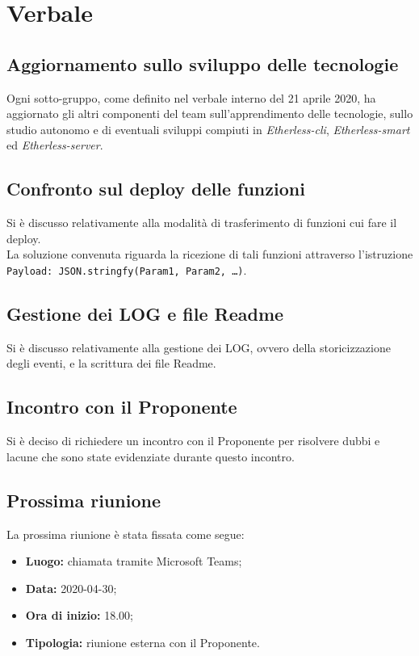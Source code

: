 \section{Verbale}

	\subsection{Aggiornamento sullo sviluppo delle tecnologie}
		Ogni sotto-gruppo, come definito nel verbale interno del 21 aprile 2020, ha aggiornato gli altri componenti del team sull'apprendimento delle tecnologie, sullo studio autonomo e di eventuali sviluppi compiuti in \textit{Etherless-cli}, \textit{Etherless-smart} ed \textit{Etherless-server}. 
	
	\subsection{Confronto sul deploy delle funzioni}
		Si è discusso relativamente alla modalità di trasferimento di funzioni cui fare il deploy.\\
		La soluzione convenuta riguarda la ricezione di tali funzioni attraverso l'istruzione \texttt{Payload: JSON.stringfy(Param1, Param2, …)}.
		
	\subsection{Gestione dei LOG e file Readme}
		Si è discusso relativamente alla gestione dei LOG, ovvero della storicizzazione degli eventi, e la scrittura dei file Readme.
	
	\subsection{Incontro con il Proponente}
		Si è deciso di richiedere un incontro con il Proponente per risolvere dubbi e lacune che sono state evidenziate durante questo incontro.
	
	\subsection{Prossima riunione}
		La prossima riunione è stata fissata come segue:
		\begin{itemize}
			\item \textbf{Luogo: } chiamata tramite Microsoft Teams; 
			\item \textbf{Data: } 2020-04-30;
			\item \textbf{Ora di inizio: } 18.00;
			\item \textbf{Tipologia: } riunione esterna con il Proponente.
		\end{itemize}
